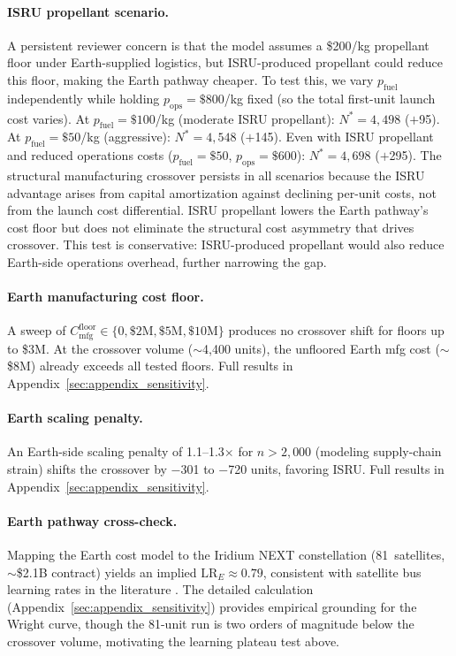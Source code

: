 \documentclass[preprint,12pt]{elsarticle}
\begin{document}
\paragraph{ISRU propellant scenario.} A persistent reviewer concern is that the model assumes a \$200/kg propellant floor under Earth-supplied logistics, but ISRU-produced propellant could reduce this floor, making the Earth pathway cheaper. To test this, we vary $p_{\mathrm{fuel}}$ independently while holding $p_{\mathrm{ops}} = \$800$/kg fixed (so the total first-unit launch cost varies). At $p_{\mathrm{fuel}} = \$100$/kg (moderate ISRU propellant): $N^* = 4{,}498$ ($+$95). At $p_{\mathrm{fuel}} = \$50$/kg (aggressive): $N^* = 4{,}548$ ($+$145). Even with ISRU propellant and reduced operations costs ($p_{\mathrm{fuel}} = \$50$, $p_{\mathrm{ops}} = \$600$): $N^* = 4{,}698$ ($+$295). The structural manufacturing crossover persists in all scenarios because the ISRU advantage arises from capital amortization against declining per-unit costs, not from the launch cost differential. ISRU propellant lowers the Earth pathway's cost floor but does not eliminate the structural cost asymmetry that drives crossover. This test is conservative: ISRU-produced propellant would also reduce Earth-side operations overhead, further narrowing the gap.

\paragraph{Earth manufacturing cost floor.} A sweep of $C_{\mathrm{mfg}}^{\mathrm{floor}} \in \{0, \$2\text{M}, \$5\text{M}, \$10\text{M}\}$ produces no crossover shift for floors up to \$3M. At the crossover volume ($\sim$4{,}400 units), the unfloored Earth mfg cost ($\sim$\$8M) already exceeds all tested floors. Full results in Appendix~\ref{sec:appendix_sensitivity}.

\paragraph{Earth scaling penalty.} An Earth-side scaling penalty of 1.1--1.3$\times$ for $n > 2{,}000$ (modeling supply-chain strain) shifts the crossover by $-$301 to $-$720 units, favoring ISRU. Full results in Appendix~\ref{sec:appendix_sensitivity}.

\paragraph{Earth pathway cross-check.} Mapping the Earth cost model to the Iridium NEXT constellation (81~satellites, $\sim$\$2.1B contract) yields an implied $\mathrm{LR}_E \approx 0.79$, consistent with satellite bus learning rates in the literature \cite{wertz2011}. The detailed calculation (Appendix~\ref{sec:appendix_sensitivity}) provides empirical grounding for the Wright curve, though the 81-unit run is two orders of magnitude below the crossover volume, motivating the learning plateau test above.
\end{document}
